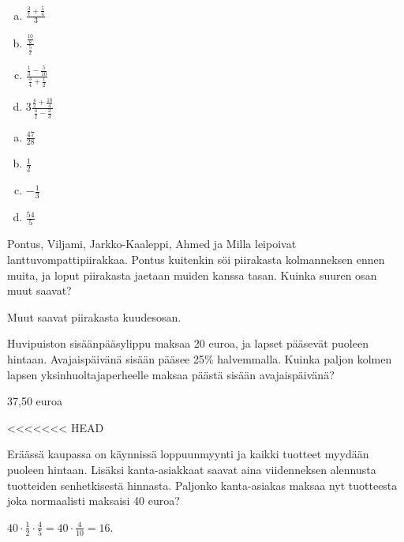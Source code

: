 \begin{tehtava} %

\begin{enumerate}[a)]
	\item $ \frac{\frac{3}{7} + \frac{5}{4}}{3}$
	\item $ \frac{\frac{10}{8}}{\frac{5}{2}}$
	\item $ \frac{\frac{1}{3} - \frac{5}{10}}{\frac{3}{4} + \frac{1}{2}}$
	\item $ 3\frac{\frac{4}{2} + \frac{10}{4}}{\frac{3}{2} - \frac{2}{3}}$
\end{enumerate}
    \begin{vastaus}		
		\begin{enumerate}[a)]
			\item $\frac{47}{28}$
			\item $\frac{1}{2}$
			\item $-\frac{1}{3}$
			\item $\frac{54}{5}$
		\end{enumerate}
    \end{vastaus}
\end{tehtava}

\begin{tehtava} %
    Pontus, Viljami, Jarkko-Kaaleppi, Ahmed ja Milla leipoivat lanttuvompattipiirakkaa.
    Pontus kuitenkin söi piirakasta kolmanneksen ennen muita, ja loput piirakasta
    jaetaan muiden kanssa tasan. Kuinka suuren osan muut saavat?
    
    \begin{vastaus}
        Muut saavat piirakasta kuudesosan.
    \end{vastaus}
\end{tehtava}

\begin{tehtava} %
    Huvipuiston sisäänpääsylippu maksaa 20 euroa, ja lapset pääsevät puoleen
    hintaan. Avajaispäivänä sisään pääsee 25\% halvemmalla. Kuinka paljon kolmen
    lapsen yksinhuoltajaperheelle maksaa päästä sisään avajaispäivänä?
    
    \begin{vastaus}
        37,50 euroa
    \end{vastaus}
\end{tehtava}

<<<<<<< HEAD
\begin{tehtava}
	Eräässä kaupassa on käynnissä loppuunmyynti ja kaikki tuotteet myydään puoleen hintaan. 
	Lisäksi kanta-asiakkaat saavat aina viidenneksen alennusta tuotteiden senhetkisestä hinnasta.
	Paljonko kanta-asiakas maksaa nyt tuotteesta joka normaalisti maksaisi 40 euroa?
	\begin{vastaus}
	$40\cdot \frac{1}{2} \cdot \frac{4}{5}=40\cdot \frac{4}{10}= 16$. 
	\end{vastaus}
\end{tehtava}

